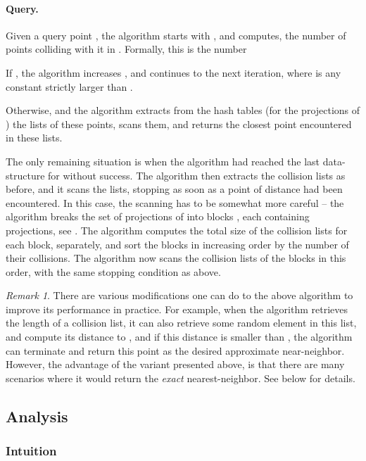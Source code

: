 \documentclass[12pt]{article}\usepackage[cm]{fullpage}
\theoremstyle{remark}\theoremheaderfont{\sf}\theorembodyfont{\upshape}\newtheorem{defn}[theorem]{Definition}
\newtheorem{remark}[theorem]{Remark}\newtheorem{example}[theorem]{Example}\newtheorem*{remark:unnumbered}[theorem]{Remark}
\numberwithin{figure}{section}\numberwithin{table}{section}\numberwithin{equation}{section}
\begin{document}
\paragraph{Query.}

Given a query point , the algorithm starts with ,
and computes, the number of points colliding with it in
. Formally, this is the number

If , the algorithm increases , and continues
to the next iteration, where  is any constant strictly larger
than .

Otherwise,  and the algorithm extracts from
the  hash tables (for the projections of ) the
lists of these  points, scans them, and returns the closest point
encountered in these lists.

The only remaining situation is when the algorithm had reached the
last data-structure for  without success. The algorithm
then extracts the collision lists as before, and it scans the lists,
stopping as soon as a point of distance  had been
encountered.  In this case, the scanning has to be somewhat more
careful -- the algorithm breaks the set of projections of 
into  blocks , each containing
 projections, see . The algorithm computes
the total size of the collision lists for each block, separately, and
sort the blocks in increasing order by the number of their
collisions. The algorithm now scans the collision lists of the blocks
in this order, with the same stopping condition as above.

\begin{remark}
    There are various modifications one can do to the above algorithm
    to improve its performance in practice. For example, when the
    algorithm retrieves the length of a collision list, it can also
    retrieve some random element in this list, and compute its
    distance to , and if this distance is smaller than
    , the algorithm can terminate and return this point
    as the desired approximate near-neighbor. However, the advantage
    of the variant presented above, is that there are many scenarios
    where it would return the \emph{exact} nearest-neighbor. See below
    for details.
\end{remark}


\subsection{Analysis}


\subsubsection{Intuition}
\end{document}
